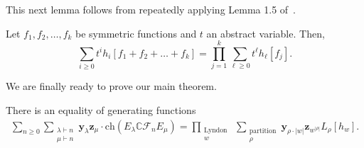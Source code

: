 \documentclass[ALCO, Unicode]{cedram}
\def\ch{\mathrm{ch}}
\def\C{{\mathbb{C}}}
\def\ch{\mathrm{ch}}
\begin{document}
This next lemma follows from repeatedly applying Lemma 1.5 of~\cite{SundaramAdvances}.

\begin{lemma}\label{lem:plethysm-properties}
Let $f_1, f_2, \ldots, f_k$ be symmetric functions and $t$ an abstract variable. Then, \[\sum_{i \geq 0}t^i h_i[f_1 + f_2 + \ldots + f_k] = \prod_{j = 1}^k \sum_{\ell \geq 0}t^\ell h_\ell[f_j].\]
\end{lemma}




We are finally ready to prove our main theorem.



\begin{thm}\label{conj:typeA-comp-factors} There is an equality of generating functions
\begin{align}
    \sum_{n \geq 0} \sum_{\substack{\lambda \vdash n\\ \mu \vdash n}}  \mathbf{y}_\lambda \mathbf{z}_\mu\cdot \ch(E_\lambda \C \mathcal{F}_n E_\mu) = \prod_{\substack{\text{Lyndon }\\ w}} \sum_{\substack{\text{partition}\\\rho}} \mathbf{y}_{\rho \cdot |w|}\mathbf{z}_{w^{|\rho|}}L_\rho[h_w].
\end{align}
\end{thm} 
\end{document}
